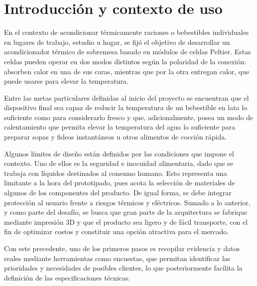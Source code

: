 \documentclass[12pt, a4paper]{article}
\begin{document}
\setcounter{page}{1}

\tableofcontents
\newpage
\listoffigures
\listoftables
\newpage


\section{Introducción y contexto de uso}

En el contexto de acondicionar térmicamente raciones o bebestibles individuales en lugares de trabajo, estudio u hogar, se fijó el objetivo de desarrollar un acondicionador térmico de sobremesa basado en módulos de celdas Peltier. Estas celdas pueden operar en dos modos distintos según la polaridad de la conexión: absorben calor en una de sus caras, mientras que por la otra entregan calor, que puede usarse para elevar la temperatura.

Entre las metas particulares definidas al inicio del proyecto se encuentran que el dispositivo final sea capaz de reducir la temperatura de un bebestible en lata lo suficiente como para considerarlo fresco y que, adicionalmente, posea un modo de calentamiento que permita elevar la temperatura del agua lo suficiente para preparar sopas y fideos instantáneos u otros alimentos de cocción rápida.

Algunos límites de diseño están definidos por las condiciones que impone el contexto. Uno de ellos es la seguridad e inocuidad alimentaria, dado que se trabaja con líquidos destinados al consumo humano. Esto representa una limitante a la hora del prototipado, pues acota la selección de materiales de algunos de los componentes del producto. De igual forma, se debe integrar protección al usuario frente a riesgos térmicos y eléctricos. Sumado a lo anterior, y como parte del desafío, se busca que gran parte de la arquitectura se fabrique mediante impresión 3D y que el producto sea ligero y de fácil transporte, con el fin de optimizar costos y constituir una opción atractiva para el mercado.

Con este precedente, uno de los primeros pasos es recopilar evidencia y datos reales mediante herramientas como encuestas, que permitan identificar las prioridades y necesidades de posibles clientes, lo que posteriormente facilita la definición de las especificaciones técnicas.
\end{document}
